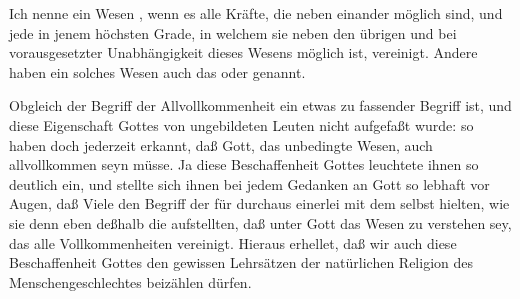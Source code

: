 \begin{aufza}
\item Ich nenne ein Wesen , wenn es alle Kräfte, die neben einander möglich sind, und jede in jenem höchsten Grade, in welchem sie neben den übrigen und bei vorausgesetzter Unabhängigkeit dieses Wesens möglich ist, vereinigt. Andere haben ein solches Wesen auch das  oder  genannt.
\item Obgleich der Begriff der Allvollkommenheit ein etwas  zu fassender Begriff ist, und diese Eigenschaft Gottes von ungebildeten Leuten nicht aufgefaßt wurde: so haben doch  jederzeit erkannt, daß Gott, das unbedingte Wesen, auch allvollkommen seyn müsse. Ja diese Beschaffenheit Gottes leuchtete ihnen so deutlich ein, und stellte sich ihnen bei jedem Gedanken an Gott so lebhaft vor Augen, daß Viele den Begriff der  für durchaus einerlei mit dem  selbst hielten, wie sie denn eben deßhalb die  aufstellten, daß unter Gott das Wesen zu verstehen sey, das alle Vollkommenheiten vereinigt. Hieraus erhellet, daß wir auch diese Beschaffenheit Gottes den gewissen Lehrsätzen der natürlichen Religion des Menschengeschlechtes beizählen dürfen.

\end{aufza}
